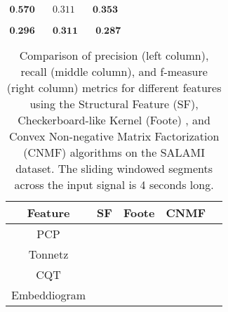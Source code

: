 \newsavebox\cqtFoote
\begin{lrbox}{\cqtFoote}
   $\begin{aligned}
     \textbf{0.570} & \quad 0.311 & \quad \textbf{0.353}
    \end{aligned} $
\end{lrbox}

\newsavebox\cqtCNMF
\begin{lrbox}{\cqtCNMF}
   $\begin{aligned}
     \textbf{0.296} & \quad \textbf{0.311} & \quad \textbf{0.287}
    \end{aligned} $
\end{lrbox}


\begin{table}
  \centering
  \begin{adjustbox}{width=\textwidth}
  \begin{threeparttable}
    \begin{tabular}{c|c|c|c|c} 
\toprule
     \textbf{Feature} & \textbf{SF} & \textbf{Foote} & \textbf{CNMF} 
     \\ \midrule 
     PCP & \usebox{\pcpSF} & \usebox{\pcpFoote} & \usebox{\pcpCNMF} \\\hline
     Tonnetz & \usebox{\tonnetzSF} & \usebox{\tonnetzFoote} & \usebox{\tonnetzCNMF} \\\hline
     CQT & \usebox{\cqtSF} & \usebox{\cqtFoote} & \usebox{\cqtCNMF} \\\hline
     Embeddiogram & \usebox{\embeddiobSF} & \usebox{\embeddiobFoote} & \usebox{\embeddiobCNMF} \\
     \bottomrule
    \end{tabular}
    \caption[Metric comparison: audio features and segmentation algorithms]{Comparison of precision (left column), recall (middle column), and f-measure (right column) metrics for different features using the Structural Feature (SF)\cite{sf}, Checkerboard-like Kernel (Foote) \cite{Foote2000AutomaticNovelty}, and Convex Non-negative Matrix Factorization (CNMF) \cite{NietoCONVEXIDENTIFICATION} algorithms on the SALAMI dataset. The sliding windowed segments across the input signal is 4 seconds long.}\label{ta:results}
  \end{threeparttable}
  \end{adjustbox}
\end{table}


